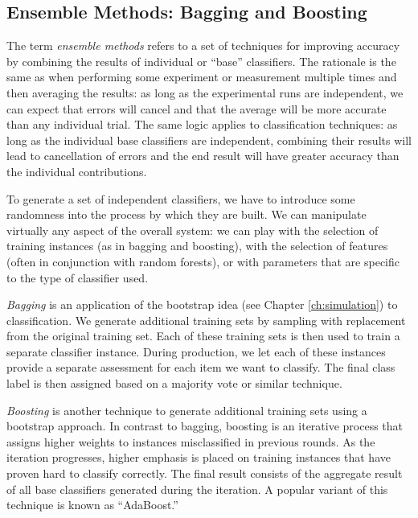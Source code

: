 \subsection{Ensemble Methods: Bagging and Boosting}


The term \emph{ensemble methods} refers to a set of techniques for
improving accuracy by combining the results of individual or ``base''
classifiers. The rationale is the same as when performing some
experiment or measurement multiple times and then averaging the
results: as long as the experimental runs are independent, we can
expect that errors will cancel and that the average will be more
accurate than any individual trial. The same logic applies to
classification techniques: as long as the individual base classifiers
are independent, combining their results will lead to cancellation of
errors and the end result will have greater accuracy than the
individual contributions.

To generate a set of independent classifiers, we have to introduce
some randomness into the process by which they are built. We can
manipulate virtually any aspect of the overall system: we can play
with the selection of training instances (as in bagging and boosting),
with the selection of features (often in conjunction with random
forests), or with parameters that are specific to the type of
classifier used.

\emph{Bagging}  is an application of the bootstrap idea (see Chapter
\ref{ch:simulation}) to classification. We generate additional
training sets by sampling with replacement from the original training
set. Each of these training sets is then used to train a separate
classifier instance. During production, we let each of these instances
provide a separate assessment for each item we want to classify. The
final class label is then assigned based on a majority vote or similar
technique.

\emph{Boosting}  is another technique to generate additional training
sets using a bootstrap approach. In contrast to bagging, boosting is
an iterative process that assigns higher weights to instances
misclassified in previous rounds.  As the iteration progresses, higher
emphasis is placed on training instances that have proven hard to
classify correctly. The final result consists of the aggregate result
of all base classifiers generated during the iteration.  A popular
variant of this technique is known as ``AdaBoost.''

